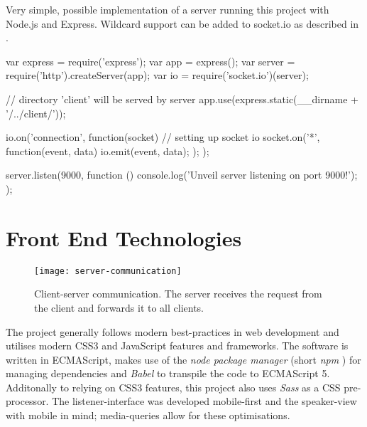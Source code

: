 \begin{program}
\caption{Very simple, possible implementation of a server running this project with Node.js and Express. Wildcard support can be added to socket.io as described in \cite{socket-io-wildcards}.}
\label{prog:implementation-server-code}
\begin{JsCode}
var express = require('express'); var app = express();
var server = require('http').createServer(app);
var io = require('socket.io')(server);

// directory 'client' will be served by server
app.use(express.static(__dirname + '/../client/'));

io.on('connection', function(socket) { // setting up socket io
  socket.on('*', function(event, data) {
    io.emit(event, data);
  });
});

server.listen(9000, function () {
  console.log('Unveil server listening on port 9000!');
});
\end{JsCode}
\end{program}

\section{Front End Technologies}
\label{sec:implementation-technologies}

\begin{figure}
\centering
\texttt{[image: server-communication]}
\caption{Client-server communication. The server receives the request from the client and forwards it to all clients.}
\label{fig:implementation-client-server-communication}
\end{figure}

The project generally follows modern best-practices in web development and utilises modern CSS3 and JavaScript features and frameworks. The software is written in ECMA\-Script, makes use of the \emph{node package manager} (short \emph{npm} \cite{npm}) for managing dependencies and \emph{Babel} \cite{babel} to transpile the code to ECMA\-Script 5. Additonally to relying on CSS3 features, this project also uses \emph{Sass} \cite{sass} as a CSS pre-processor. The listener-interface was developed mobile-first and the speaker-view with mobile in mind; media-queries allow for these optimisations.

